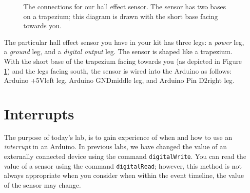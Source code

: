 \documentclass[11pt,a4paper]{article}
\begin{document}
\begin{figure}[ht]
    \begin{center}
    \end{center}
    \caption{The connections for our hall effect sensor. The sensor has two bases on a trapezium; this diagram is drawn with the short base facing towards you.}
    \label{fig:hall-effect-sensor}
\end{figure}

The particular hall effect sensor you have in your kit has three legs: a \textit{power} leg, a \textit{ground} leg, and a \textit{digital output} leg. The sensor is shaped like a trapezium. With the short base of the trapezium facing towards you (as depicted in Figure \ref{fig:hall-effect-sensor}) and the legs facing south, the sensor is wired into the Arduino as follows: Arduino +5V\textrightarrow left leg, Arduino GND\textrightarrow middle leg, and Arduino Pin D2\textrightarrow right leg.

\section*{Interrupts}
The purpose of today's lab, is to gain experience of when and how to use an \textit{interrupt} in an Arduino. In previous labs, we have changed the value of an externally connected device using the command \verb|digitalWrite|. You can read the value of a sensor using the command \verb|digitalRead|; however, this method is not always appropriate when you consider when within the event timeline, the value of the sensor may change.
\end{document}
